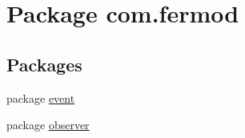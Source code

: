 \hypertarget{namespacecom_1_1fermod}{}\section{Package com.\+fermod}
\label{namespacecom_1_1fermod}
\subsection*{Packages}
\begin{DoxyCompactItemize}
\item 
package \mbox{\hyperlink{namespacecom_1_1fermod_1_1event}{event}}
\item 
package \mbox{\hyperlink{namespacecom_1_1fermod_1_1observer}{observer}}
\end{DoxyCompactItemize}
